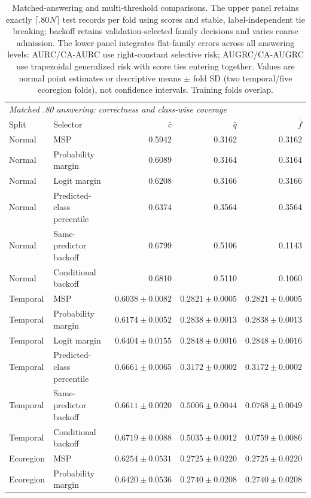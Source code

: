 \begin{table}[htbp]
\centering\scriptsize
\setlength{\tabcolsep}{2.8pt}
\caption{Matched-answering and multi-threshold comparisons. The upper panel retains exactly $\lceil.80N\rceil$ test records per fold using scores and stable, label-independent tie breaking; backoff retains validation-selected family decisions and varies coarse admission. The lower panel integrates flat-family errors across all answering levels: AURC/CA-AURC use right-constant selective risk; AUGRC/CA-AUGRC use trapezoidal generalized risk with score ties entering together. Values are normal point estimates or descriptive means $\pm$ fold SD (two temporal/five ecoregion folds), not confidence intervals. Training folds overlap.}\label{tab:supp-matched-selection}
\begin{tabular}{llrrr}
\toprule
\multicolumn{5}{l}{\textit{Matched .80 answering: correctness and class-wise coverage}} \\
Split & Selector & $\bar c$ & $\bar q$ & $\bar f$ \\
\midrule
Normal & MSP & 0.5942 & 0.3162 & 0.3162 \\
Normal & Probability margin & 0.6089 & 0.3164 & 0.3164 \\
Normal & Logit margin & 0.6208 & 0.3166 & 0.3166 \\
Normal & Predicted-class percentile & 0.6374 & 0.3564 & 0.3564 \\
Normal & Same-predictor backoff & 0.6799 & 0.5106 & 0.1143 \\
Normal & Conditional backoff & 0.6810 & 0.5110 & 0.1060 \\
Temporal & MSP & $0.6038\pm0.0082$ & $0.2821\pm0.0005$ & $0.2821\pm0.0005$ \\
Temporal & Probability margin & $0.6174\pm0.0052$ & $0.2838\pm0.0013$ & $0.2838\pm0.0013$ \\
Temporal & Logit margin & $0.6404\pm0.0155$ & $0.2848\pm0.0016$ & $0.2848\pm0.0016$ \\
Temporal & Predicted-class percentile & $0.6661\pm0.0065$ & $0.3172\pm0.0002$ & $0.3172\pm0.0002$ \\
Temporal & Same-predictor backoff & $0.6611\pm0.0020$ & $0.5006\pm0.0044$ & $0.0768\pm0.0049$ \\
Temporal & Conditional backoff & $0.6719\pm0.0088$ & $0.5035\pm0.0012$ & $0.0759\pm0.0086$ \\
Ecoregion & MSP & $0.6254\pm0.0531$ & $0.2725\pm0.0220$ & $0.2725\pm0.0220$ \\
Ecoregion & Probability margin & $0.6420\pm0.0536$ & $0.2740\pm0.0208$ & $0.2740\pm0.0208$ \\

\end{tabular}
\end{table}
